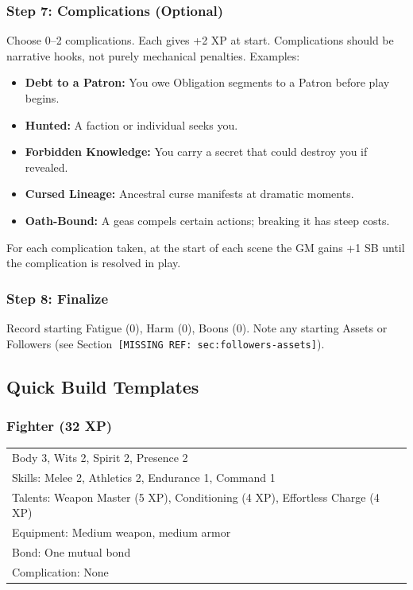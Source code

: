 \subsubsection{Step 7: Complications (Optional)}
Choose 0--2 complications. Each gives +2 XP at start. Complications should be narrative hooks, not purely mechanical penalties. Examples:

\begin{itemize}
  \item \textbf{Debt to a Patron:} You owe Obligation segments to a Patron before play begins.
  \item \textbf{Hunted:} A faction or individual seeks you.
  \item \textbf{Forbidden Knowledge:} You carry a secret that could destroy you if revealed.
  \item \textbf{Cursed Lineage:} Ancestral curse manifests at dramatic moments.
  \item \textbf{Oath-Bound:} A geas compels certain actions; breaking it has steep costs.
\end{itemize}

For each complication taken, at the start of each scene the GM gains +1 SB until the complication is resolved in play.

\subsubsection{Step 8: Finalize}
Record starting Fatigue (0), Harm (0), Boons (0). Note any starting Assets or Followers (see Section~\texttt{[MISSING REF: sec:followers-assets]}).

\subsection{Quick Build Templates}

\subsubsection{Fighter (32 XP)}
\begin{tabular}{@{}ll@{}}
Body 3, Wits 2, Spirit 2, Presence 2 \\
Skills: Melee 2, Athletics 2, Endurance 1, Command 1 \\
Talents: Weapon Master (5 XP), Conditioning (4 XP), Effortless Charge (4 XP) \\
Equipment: Medium weapon, medium armor \\
Bond: One mutual bond \\
Complication: None \\
\end{tabular}

